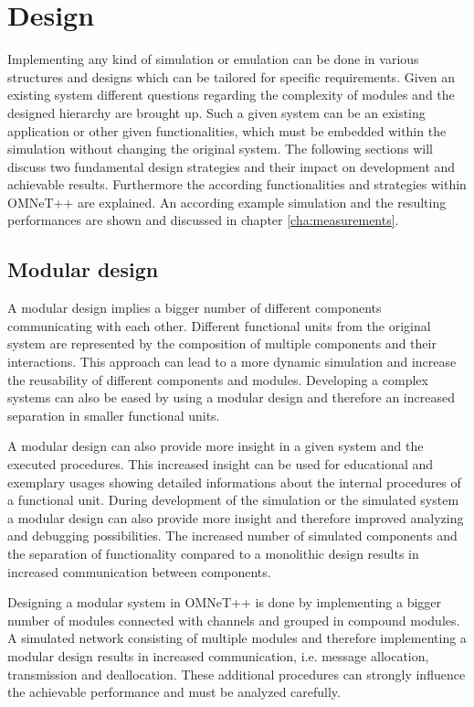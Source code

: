 \chapter{Design}
\label{cha:design}
Implementing any kind of simulation or emulation can be done in various structures and designs which can be tailored for specific requirements.
Given an existing system different questions regarding the complexity of modules and the designed hierarchy are brought up.
Such a given system can be an existing application or other given functionalities, which must be embedded within the simulation without changing the original system.
The following sections will discuss two fundamental design strategies and their impact on development and achievable results.
Furthermore the according functionalities and strategies within OMNeT++ are explained.
An according example simulation and the resulting performances are shown and discussed in chapter \ref{cha:measurements}.

\section{Modular design}
\label{sec:design_modular}
A modular design implies a bigger number of different components communicating with each other.
Different functional units from the original system are represented by the composition of multiple components and their interactions.
This approach can lead to a more dynamic simulation and increase the reusability of different components and modules.
Developing a complex systems can also be eased by using a modular design and therefore an increased separation in smaller functional units.

A modular design can also provide more insight in a given system and the executed procedures.
This increased insight can be used for educational and exemplary usages showing detailed informations about the internal procedures of a functional unit.
During development of the simulation or the simulated system a modular design can also provide more insight and therefore improved analyzing and debugging possibilities.
The increased number of simulated components and the separation of functionality compared to a monolithic design results in increased communication between components.

Designing a modular system in OMNeT++ is done by implementing a bigger number of modules connected with channels and grouped in compound modules.
A simulated network consisting of multiple modules and therefore implementing a modular design results in increased communication, i.e. message allocation, transmission and deallocation.
These additional procedures can strongly influence the achievable performance and must be analyzed carefully.

